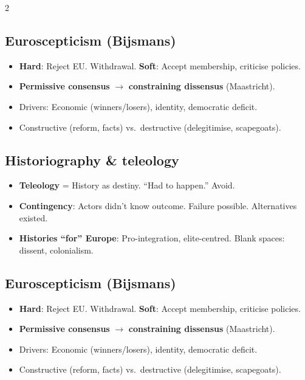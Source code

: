 \documentclass[8pt,landscape,a4paper]{article}
\begin{document}
\begin{multicols}{2}
\subsection*{Euroscepticism (Bijsmans)}
\begin{itemize}[leftmargin=*,nosep]
\item \textbf{Hard}: Reject EU. Withdrawal. \textbf{Soft}: Accept membership, criticise policies.
\item \textbf{Permissive consensus} $\to$ \textbf{constraining dissensus} (Maastricht).
\item Drivers: Economic (winners/losers), identity, democratic deficit.
\item Constructive (reform, facts) vs.\ destructive (delegitimise, scapegoats).
\end{itemize}

\subsection*{Historiography \& teleology}
\begin{itemize}[leftmargin=*,nosep]
\item \textbf{Teleology} = History as destiny. ``Had to happen.'' Avoid.
\item \textbf{Contingency}: Actors didn't know outcome. Failure possible. Alternatives existed.
\item \textbf{Histories ``for'' Europe}: Pro-integration, elite-centred. Blank spaces: dissent, colonialism.
\end{itemize}

\subsection*{Euroscepticism (Bijsmans)}
\begin{itemize}[leftmargin=*,nosep]
\item \textbf{Hard}: Reject EU. Withdrawal. \textbf{Soft}: Accept membership, criticise policies.
\item \textbf{Permissive consensus} $\to$ \textbf{constraining dissensus} (Maastricht).
\item Drivers: Economic (winners/losers), identity, democratic deficit.
\item Constructive (reform, facts) vs.\ destructive (delegitimise, scapegoats).
\end{itemize}


\end{multicols}
\end{document}
